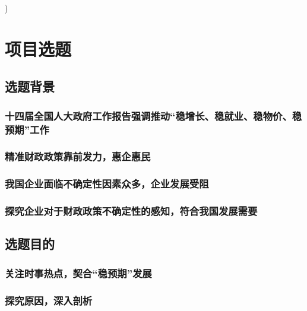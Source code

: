 \documentclass [UTF8] {ctexart}
\begin{document}
\begin{titlepage}	
 
 
 

\tableofcontents
\thispagestyle{empty}%

\newpage
\setcounter{page}{1}%
\end{titlepage})
\section{项目选题}
\subsection{选题背景}
\subsubsection{十四届全国人大政府工作报告强调推动“稳增长、稳就业、稳物价、稳预期”工作}

\subsubsection{精准财政政策靠前发力，惠企惠民}

\subsubsection{我国企业面临不确定性因素众多，企业发展受阻}

\subsubsection{探究企业对于财政政策不确定性的感知，符合我国发展需要}

\subsection{选题目的 }
\subsubsection{关注时事热点，契合“稳预期”发展}

\subsubsection{探究原因，深入剖析}

\end{document}
